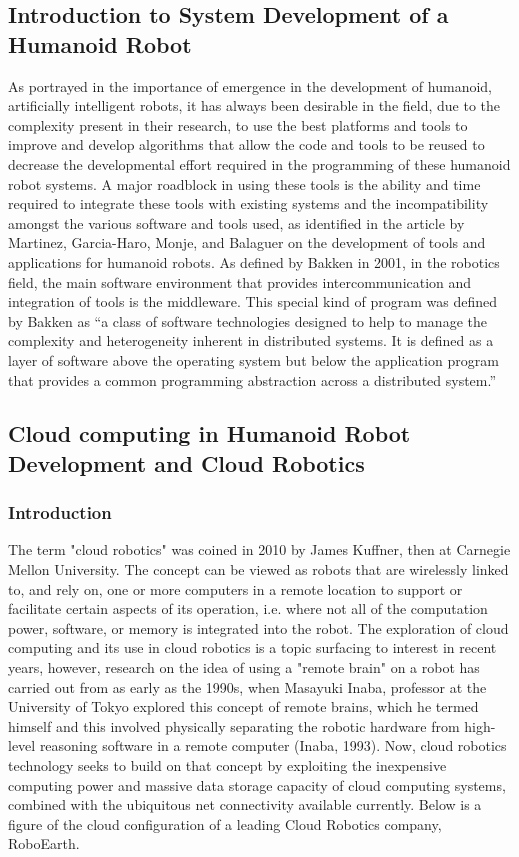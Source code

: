 \documentclass[conference]{IEEEtran}
\begin{document}
\subsection{Introduction to System Development of a Humanoid Robot}
As portrayed in the importance of emergence in the development of humanoid, artificially intelligent robots, it has always been desirable in the field, due to the complexity present in their research, to use the best platforms and tools to improve and develop algorithms that allow the code and tools to be reused to decrease the developmental effort required in the programming of these humanoid robot systems. A major roadblock in using these tools is the ability and time required to integrate these tools with existing systems and the incompatibility amongst the various software and tools used, as identified in the article by Martinez, Garcia-Haro, Monje, and Balaguer on the development of tools and applications for humanoid robots\autocite{1martinezdevelopment}. As defined by Bakken in 2001, in the robotics field, the main software environment that provides intercommunication and integration of tools is the middleware. This special kind of program was defined by Bakken as ``a class of software technologies designed to help to manage the complexity and heterogeneity inherent in distributed systems. It is defined as a layer of software above the operating system but below the application program that provides a common programming abstraction across a distributed system.''\autocite{2bakken2001middleware}

\subsection{Cloud computing in Humanoid Robot Development and Cloud Robotics}
\subsubsection{Introduction}
The term "cloud robotics" was coined in 2010 by James Kuffner, then at Carnegie Mellon University. The concept can be viewed as robots that are wirelessly linked to, and rely on, one or more computers in a remote location to support or facilitate certain aspects of its operation, i.e. where not all of the computation power, software, or memory is integrated into the robot\autocite{3bogue2017cloud}. The exploration of cloud computing and its use in cloud robotics is a topic surfacing to interest in recent years, however, research on the idea of using a "remote brain" on a robot has carried out from as early as the 1990s, when Masayuki Inaba, professor at the University of Tokyo explored this concept of remote brains, which he termed himself and this involved physically separating the robotic hardware from high-level reasoning software in a remote computer (Inaba, 1993). Now, cloud robotics technology seeks to build on that concept by exploiting the inexpensive computing power and massive data storage capacity of cloud computing systems, combined with the ubiquitous net connectivity available currently\autocite{3bogue2017cloud}. Below is a figure of the cloud configuration of a leading Cloud Robotics company, RoboEarth\autocite{13wan2016cloud}.
\end{document}
